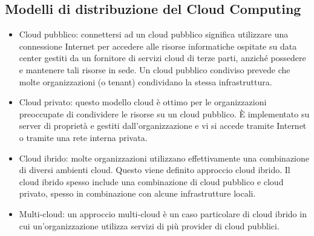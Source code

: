 \subsection{Modelli di distribuzione del Cloud Computing}
\begin{itemize}
    \item Cloud pubblico: connettersi ad un cloud pubblico significa utilizzare una connessione Internet per accedere alle risorse informatiche ospitate su data center gestiti da un fornitore di servizi cloud di terze parti, anziché possedere e mantenere tali risorse in sede. Un cloud pubblico condiviso prevede che molte organizzazioni (o tenant) condividano la stessa infrastruttura.
    \item Cloud privato: questo modello cloud è ottimo per le organizzazioni preoccupate di condividere le risorse su un cloud pubblico. È implementato su server di proprietà e gestiti dall'organizzazione e vi si accede tramite Internet o tramite una rete interna privata.
    \item Cloud ibrido: molte organizzazioni utilizzano effettivamente una combinazione di diversi ambienti cloud. Questo viene definito approccio cloud ibrido. Il cloud ibrido spesso include una combinazione di cloud pubblico e cloud privato, spesso in combinazione con alcune infrastrutture locali.
    \item Multi-cloud: un approccio multi-cloud è un caso particolare di cloud ibrido in cui un'organizzazione utilizza servizi di più provider di cloud pubblici. 
\end{itemize}
